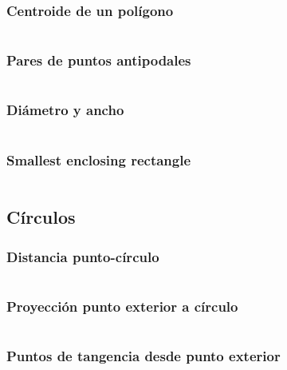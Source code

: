 \documentclass[11pt]{article}
\begin{document}
			\subsubsection{Centroide de un polígono}
			\inputminted[tabsize=2,breaklines,firstline=259,lastline=269,fontsize=\small]{c++}{geometry.cpp}
			
			\subsubsection{Pares de puntos antipodales}
			\inputminted[tabsize=2,breaklines,firstline=271,lastline=282,fontsize=\small]{c++}{geometry.cpp}
			
			\subsubsection{Diámetro y ancho}
			\inputminted[tabsize=2,breaklines,firstline=284,lastline=298,fontsize=\small]{c++}{geometry.cpp}
			
			\subsubsection{Smallest enclosing rectangle}
			\inputminted[tabsize=2,breaklines,firstline=300,lastline=319,fontsize=\small]{c++}{geometry.cpp}
		
		\subsection{Círculos}
			\subsubsection{Distancia punto-círculo}
			\inputminted[tabsize=2,breaklines,firstline=321,lastline=324,fontsize=\small]{c++}{geometry.cpp}
			
			\subsubsection{Proyección punto exterior a círculo}
			\inputminted[tabsize=2,breaklines,firstline=326,lastline=329,fontsize=\small]{c++}{geometry.cpp}
			
			\subsubsection{Puntos de tangencia desde punto exterior}
			\inputminted[tabsize=2,breaklines,firstline=331,lastline=337,fontsize=\small]{c++}{geometry.cpp}
			
\end{document}
